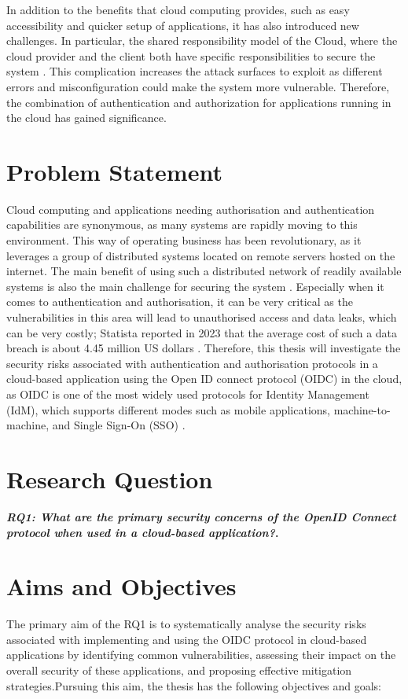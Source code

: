 In addition to the benefits that cloud computing provides, such as easy accessibility and quicker setup of applications, it has also introduced new challenges. In particular, the shared responsibility model of the Cloud, where the cloud provider and the client both have specific responsibilities to secure the system \citep{shared_principal}. This complication increases the attack surfaces to exploit as different errors and misconfiguration could make the system more vulnerable. Therefore, the combination of authentication and authorization for applications running in the cloud has gained significance. 


\section{Problem Statement}
Cloud computing and applications needing authorisation and authentication capabilities are synonymous, as many systems are rapidly moving to this environment. This way of operating business has been revolutionary, as it leverages a group of distributed systems located on remote servers hosted on the internet. The main benefit of using such a distributed network of readily available systems is also the main challenge for securing the system \citep{Alouffi2021-yh}. Especially when it comes to authentication and authorisation, it can be very critical as the vulnerabilities in this area will lead to unauthorised access and data leaks, which can be very costly; Statista reported in 2023 that the average cost of such a data breach is about 4.45 million US dollars \citep{statista_data_breach}. Therefore, this thesis will investigate the security risks associated with authentication and authorisation protocols in a cloud-based application using the Open ID connect protocol (OIDC) in the cloud, as OIDC is one of the most widely used protocols for Identity Management (IdM), which supports different modes such as mobile applications, machine-to-machine, and Single Sign-On (SSO) \citep{oidc_popular}.

\section{Research Question}\label{sec:objectives}
\textbf{\textit{RQ1: What are the primary security concerns of the OpenID Connect protocol when used in a cloud-based application?}.}


\section{Aims and Objectives}
The primary aim of the RQ1 is to systematically analyse the security risks associated with implementing and using the OIDC protocol in cloud-based applications by identifying common vulnerabilities, assessing their impact on the overall security of these applications, and proposing effective mitigation strategies.Pursuing this aim, the thesis has the following objectives and goals:

